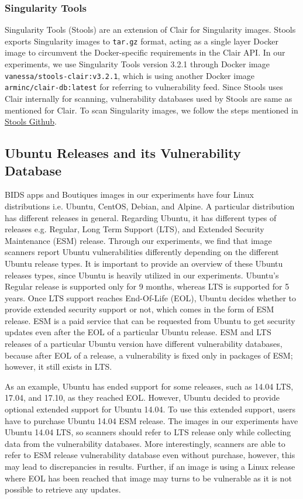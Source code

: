 \documentclass[a4paper,num-refs]{oup-contemporary}
\begin{document}
\subsubsection{Singularity Tools}

Singularity Tools (Stools)
are an extension of Clair for Singularity images. Stools
exports Singularity images to \texttt{tar.gz} format, acting as a single layer Docker image
to circumvent the Docker-specific requirements in the Clair API.
In our experiments, we use Singularity Tools version 3.2.1 through Docker
image
\texttt{vanessa/stools-clair:v3.2.1}, which is using another Docker
image \texttt{arminc/clair-db:latest} for referring to vulnerability feed.
Since Stools uses Clair internally for scanning, vulnerability databases used
by Stools are same as mentioned for Clair.
To scan Singularity images, we follow the steps mentioned in
\href{https://github.com/singularityhub/stools}{Stools Github}.

\subsection{Ubuntu Releases and its Vulnerability Database}

BIDS apps and Boutiques images in our experiments have four Linux
distributions i.e. Ubuntu, CentOS, Debian, and Alpine. A particular
distribution has different releases in general. Regarding Ubuntu, it has different
types of releases e.g. Regular, Long Term Support (LTS), and Extended Security Maintenance (ESM) release.
Through our experiments, we find that image scanners report Ubuntu vulnerabilities 
differently depending on the different Ubuntu release types. It is 
important to provide an overview of these Ubuntu releases types, 
since Ubuntu is heavily utilized in our experiments. 
Ubuntu's Regular release is supported only for 9 months, whereas LTS is supported for 5 years. Once LTS support
reaches End-Of-Life (EOL), Ubuntu decides whether to provide extended security support or not, which comes
in the form of ESM release.
ESM is a paid service that can be requested from Ubuntu to get security 
updates even after the EOL of a particular Ubuntu release. ESM and LTS releases of a particular Ubuntu version have different vulnerability
databases, because after EOL of a release, a vulnerability is fixed only in packages of ESM; however, it still
exists in LTS.

As an example, Ubuntu has ended support for some releases, such as 14.04 LTS,
17.04, and 17.10, as they reached EOL. However, Ubuntu decided to provide optional extended support for Ubuntu 14.04.
To use this extended support, users have to purchase Ubuntu 14.04 ESM release.
The images in our experiments have Ubuntu 14.04 LTS, so scanners should refer
to LTS release only while collecting data from the vulnerability databases.
More interestingly, scanners are able to refer to ESM release vulnerability database
even without purchase, however, this may lead to discrepancies in results.
Further, if an image is using a Linux release where EOL has been reached that image may
turns to be vulnerable as it is not possible to retrieve any updates.
\end{document}
